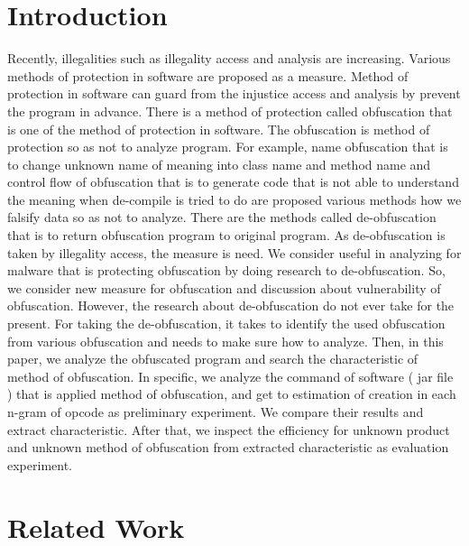 \documentclass[conference]{IEEEtran}
\begin{document}

%
\IEEEpeerreviewmaketitle

\section{Introduction}
Recently, illegalities such as illegality access and analysis are
increasing.  Various methods of protection in software are proposed as
a measure.  Method of protection in software can guard from the
injustice access and analysis by prevent the program in advance.
There is a method of protection called obfuscation that is one of the
method of protection in software.  The obfuscation is method of
protection so as not to analyze program.
%
For example, name obfuscation that is to change unknown name of
meaning into class name and method name and control flow of
obfuscation that is to generate code that is not able to understand
the meaning when de-compile is tried to do are proposed various
methods how we falsify data so as not to analyze.  There are the
methods called de-obfuscation that is to return obfuscation program to
original program.  As de-obfuscation is taken by illegality access,
the measure is need.  We consider useful in analyzing for malware that
is protecting obfuscation by doing research to de-obfuscation.  So, we
consider new measure for obfuscation and discussion about
vulnerability of obfuscation.  However, the research about
de-obfuscation do not ever take for the present.  For taking the
de-obfuscation, it takes to identify the used obfuscation from various
obfuscation and needs to make sure how to analyze.  Then, in this
paper, we analyze the obfuscated program and search the characteristic
of method of obfuscation.  In specific, we analyze the command of
software ( jar file ) that is applied method of obfuscation, and get
to estimation of creation in each n-gram of opcode as preliminary
experiment.  We compare their results and extract characteristic.
After that, we inspect the efficiency for unknown product and unknown
method of obfuscation from extracted characteristic as evaluation
experiment.

\section{Related Work}
\end{document}
